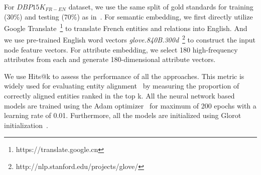 	For $DBP15K_{FR-EN}$ dataset, we use the same split of gold standards for training (30\%) and testing (70\%) as in~\cite{sun2017cross}.
	For semantic embedding, we first directly utilize Google Translate~\footnote{https://translate.google.cn} to translate French entities and relations into English.
	And we use pre-trained English word vectors \emph{glove.840B.300d}~\footnote{http://nlp.stanford.edu/projects/glove/} to construct the input node feature vectors.
	For attribute embedding, we select 180 high-frequency attributes from each \KG and generate 180-dimensional attribute vectors.
	
	We use Hits@k to assess the performance of all the approaches.
	This metric is widely used for evaluating entity alignment~\cite{hao2016joint,chen2016multilingual,sun2017cross,zhu2017iterative} by measuring the proportion of correctly aligned entities ranked in the top k.
	All the neural network based models are trained using the Adam optimizer~\cite{Kingma2014Adam} for maximum of 200 epochs with a learning rate
    of 0.01.
    Furthermore, all the models are initialized using Glorot initialization~\cite{Glorot2010Understanding}.
	
